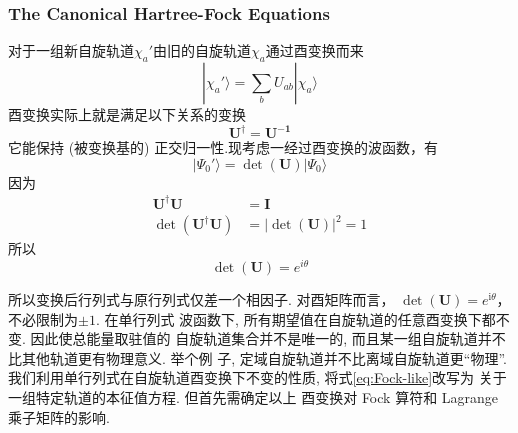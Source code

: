 \documentclass[fontset=none,12pt,a4paper]{ctexart}
\numberwithin{equation}{section}
\begin{document}
\subsubsection{The Canonical Hartree-Fock Equations}
对于一组新自旋轨道${\chi_a'}$由旧的自旋轨道${\chi_a}$通过酉变换而来
\begin{equation}
  |\chi_a'\rangle=\sum_b U_{ab}|\chi_a\rangle
\end{equation}
酉变换实际上就是满足以下关系的变换
\begin{equation}
  \mathbf{U^\dagger}=\mathbf{U^{-1}}
\end{equation}
它能保持 (被变换基的) 正交归一性.现考虑一经过酉变换的波函数，有
\begin{equation}
  |\Psi_0'\rangle=\det(\mathbf{U})|\Psi_0\rangle
\end{equation}
因为
\begin{align*}
  \mathbf{U}^{\dagger}\mathbf{U} &= \mathbf{I} \\
  \det(\mathbf{U}^{\dagger}\mathbf{U}) &= |\det(\mathbf{U})|^2 = 1
\end{align*}
所以
\begin{equation}
  \det(\mathbf{U})=e^{i\theta}
\end{equation}

所以变换后行列式与原行列式仅差一个相因子. 对酉矩阵而言，
\(\det(\mathbf{U})=e^{\mathrm{i}\theta}\)，不必限制为$\pm1$.
在单行列式 波函数下, 所有期望值在自旋轨道的任意酉变换下都不变. 因此使总能量取驻值的
自旋轨道集合并不是唯一的, 而且某一组自旋轨道并不比其他轨道更有物理意义. 举个例 子,
 定域自旋轨道并不比离域自旋轨道更“物理”.我们利用单行列式在自旋轨道酉变换下不变的性质,
 将式\ref{eq:Fock-like}改写为 关于一组特定轨道的本征值方程. 但首先需确定以上
 酉变换对 Fock 算符和 Lagrange 乘子矩阵的影响.
\end{document}
